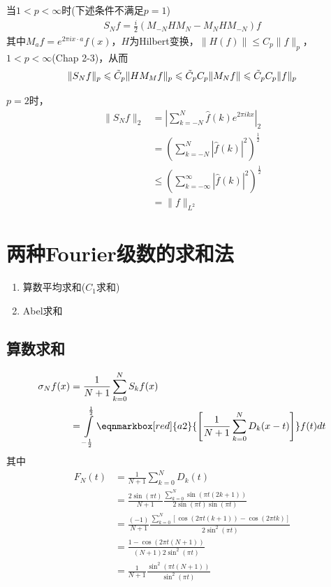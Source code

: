 当$1< p<\infty$时(下述条件不满足$p=1$)
\begin{align*}
    S_N f = \frac{i}{2} \left(M_{-N}HM_{N} - M_N H M_{-N} \right)f
\end{align*}
其中$M_a f = e^{2\pi i x\cdot a} f(x)$，$H$为Hilbert变换，$\|H(f)\| \leqslant C_p\|f\|_p$，$1<p<\infty$(Chap 2-3)，从而
\begin{align*}
    \|S_N f\|_p \leqslant \Tilde{C}_p \|H M_M f\|_p \leqslant \Tilde{C}_p C_p \|M_N f\| \leqslant \Tilde{C}_p C_p \|f\|_p
\end{align*}

$p=2$时，
\begin{align*}
    \|S_N f\|_2 &= \left|\sum\limits_{k=-N}^{N} \hat{f}(k) e^{2\pi i k x} \right|_2 \\
    &= \left(\sum\limits_{k=-N}^N |\hat{f}(k)|^2 \right)^{\frac{1}{2}} \\
    & \leqslant \left(\sum\limits_{k=-\infty}^{\infty} |\hat{f}(k)|^2 \right)^{\frac{1}{2}} \\
    & = \|f\|_{L^2}
\end{align*}


\newpage
\section{两种Fourier级数的求和法}
\begin{enumerate}[leftmargin=1cm, label=\arabic*]
    \item 算数平均求和($C_1$求和)
    \item Abel求和
\end{enumerate}

\subsection{算数求和}
\begin{definition}[算数平均求和]
    \begin{align*}
        \sigma_N f(x) &= \frac{1}{N+1} \sum\limits_{k=0}^N S_k f(x) \\
        &= \int\limits_{-\frac{1}{2}}^{\frac{1}{2}} \eqnmarkbox[red]{a2}{\left[ \frac{1}{N+1} \sum\limits_{k=0}^N D_k(x-t) \right]} f(t) dt 
    \end{align*}
    其中
    \begin{align*}
        F_N(t) &= \frac{1}{N+1} \sum\limits_{k=0}^N D_k(t) \\
        &= \frac{2\sin(\pi t)}{N+1} \frac{\sum\limits_{k=0}^N \sin(\pi t(2k+1))}{2\sin(\pi t)\sin(\pi t)} \\
        & = \frac{(-1)}{N+1} \frac{\sum\limits_{k=0}^N [\cos(2\pi t(k+1)) - \cos(2\pi t k)]}{2\sin^2(\pi t)} \\
        & = \frac{1-\cos(2\pi t(N+1))}{(N+1)2\sin^2(\pi t)} \\
        & = \frac{1}{N+1} \frac{\sin^2 (\pi t(N+1))}{\sin^2(\pi t)}
    \end{align*}
\end{definition}

